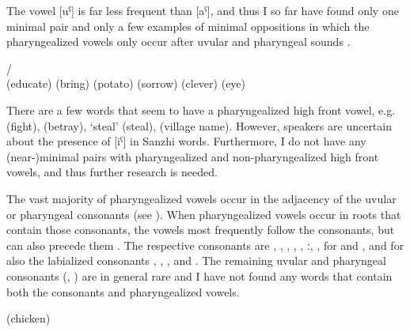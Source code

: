 The vowel [uˁ] is far less frequent than [aˁ], and thus I so far have found only one minimal pair and only a few examples of minimal oppositions in which the pharyngealized vowels only occur after uvular and pharyngeal sounds .
%
\begin{exe}
	\ex	\label{ex:pharyngealization minimal pairs B phon@A}
	\begin{xlist}
	\TabPositions{15em}
		\ex	{} /   \tab {} \\
		(educate) \tab (bring)
		\ex	{}  (potato) \tab {}  (sorrow)
		\ex	{} 		\tab {}  (clever)
		\ex	{} 		\tab {}  (eye)
	\end{xlist}
\end{exe}

There are a few words that seem to have a pharyngealized high front vowel, e.g.   (fight),   (betray),  `steal' (steal),  (village name). However, speakers are uncertain about the presence of [iˁ] in Sanzhi words. Furthermore, I do not have any (near-)minimal pairs with pharyngealized and non-pharyngealized high front vowels, and thus further research is needed.

The vast majority of pharyngealized vowels occur in the adjacency of the uvular or pharyngeal consonants (see ). When pharyngealized vowels occur in roots that contain those consonants, the vowels most frequently follow the consonants, but can also precede them . The respective consonants are , , , , , ː, ,  for  and , and for  also the labialized consonants , , , and . The remaining uvular and pharyngeal consonants (, ) are in general rare and I have not found any words that contain both the consonants and pharyngealized vowels.
%
\begin{exe}
	\ex	\label{ex:uvular pharyngealphon1}
\TabPositions{15em}
  (chicken)	\tab {} 	\\
 	\tab {} 	\\
 	\tab {} 	\\
 	
\end{exe}

